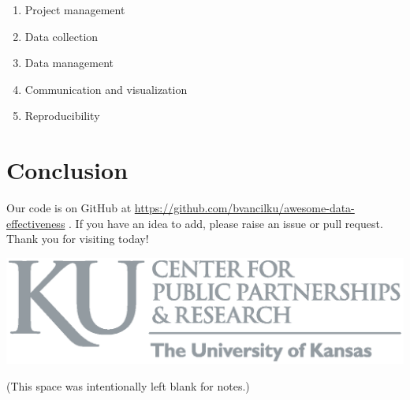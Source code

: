 \documentclass[a0paper,fleqn]{betterposter-latex-template/betterposter}
\begin{document}
{\begin{enumerate}
    \item Project management
    \item Data collection
    \item Data management
    \item Communication and visualization
    \item Reproducibility
\end{enumerate}

\section{Conclusion}

Our code is on GitHub at \url{https://github.com/bvancilku/awesome-data-effectiveness} . If you have an idea to add, please raise an issue or pull request. Thank you for visiting today!

\vfill

\includegraphics[width=\textwidth]{img/cppr-gray-01.eps}\\

}{

(This space was intentionally left blank for notes.)
}
\end{document}
